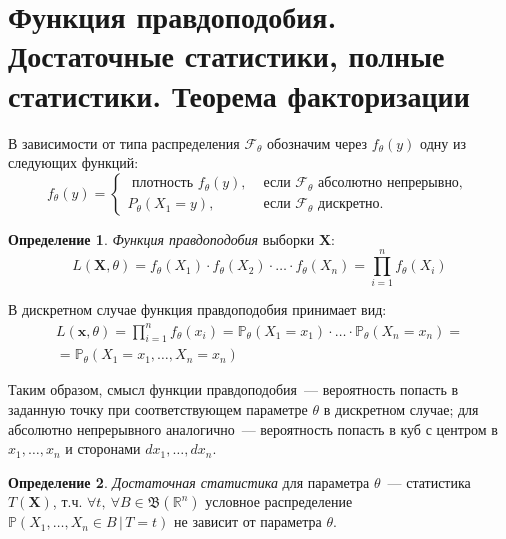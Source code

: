 \documentclass[oneside,final,14pt]{extreport}
\theoremstyle{definition}
\newtheorem{defn}{Определение}[section]
\begin{document}
\section{Функция правдоподобия. Достаточные статистики, полные статистики. Теорема факторизации}

В зависимости от типа распределения $\mathcal{F}_\theta$ обозначим через $f_{\theta}(y)$ одну из следующих функций:
\begin{equation*}
    f_{\theta}(y) =
    \left\{\begin{array}{ll}
    \text { плотность } f_{\theta}(y), & \text { если } \mathcal{F}_{\theta} \text { абсолютно непрерывно, } \\
    P_{\theta}\left(X_{1}=y\right), & \text { если } \mathcal{F}_{\theta} \text { дискретно. }
    \end{array}\right.
\end{equation*}

\begin{defn}
{\it Функция правдоподобия} выборки $\mathbf{X}$:
\begin{equation*}
    L(\mathbf{X} , \theta)=f_{\theta}\left(X_{1}\right) \cdot f_{\theta}\left(X_{2}\right) \cdot \ldots \cdot f_{\theta}\left(X_{n}\right)=\prod_{i=1}^{n} f_{\theta}\left(X_{i}\right)
\end{equation*}
\end{defn}

В дискретном случае функция правдоподобия принимает вид:
\begin{equation*}
\begin{aligned}
    L(\mathbf{x} , \theta)=\prod_{i=1}^{n} f_{\theta}(x_{i}) 
    = \mathbb{P}_{\theta}(X_{1}=x_{1}) \cdot \ldots \cdot \mathbb{P}_{\theta}(X_{n}=x_{n}) = \\
    = \mathbb{P}_{\theta}(X_{1}=x_{1}, \ldots, X_{n}=x_{n})
\end{aligned}
\end{equation*}

Таким образом, смысл функции правдоподобия~--- вероятность попасть в заданную точку при соответствующем параметре $\theta$ в дискретном случае; для абсолютно непрерывного аналогично~--- вероятность попасть в куб с центром в $x_1, \ldots, x_n$ и сторонами $dx_1, \ldots, dx_n$.

\begin{defn}
{\it Достаточная статистика} для параметра $\theta$~--- статистика $T(\mathbf{X})$, т.ч. $\forall t,~ \forall B \in \mathfrak{B}(\mathbb{R}^{n})$ условное распределение $\mathbb{P}(X_1, \ldots, X_n \in B\,|\,T=t)$ не зависит от параметра $\theta$.
\end{defn}
\end{document}
